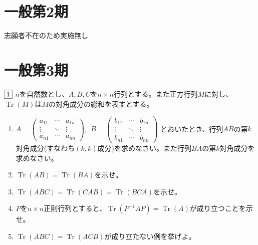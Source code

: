 \documentclass[dvipdfmx]{jsreport}
\DeclareMathOperator{\Tr}{Tr}
\newcounter{num}[section]
\begin{document}
\begin{answer}
\begin{enumerate}
\end{enumerate}
\end{answer}

\section{一般第2期}
	志願者不在のため実施無し

\section{一般第3期}
\begin{tcolorbox} %
	$\fbox{1}$ $n$を自然数とし、$A, B, C$を$n\times n$行列とする。また正方行列$M$に対し、$\Tr{(M)}$は$M$の対角成分の総和を表すとする。
\begin{enumerate}
	\item $
	A= 
\begin{pmatrix}
	a_{11}& \cdots& a_{1n}\\
	\vdots& \ddots& \vdots\\
	a_{n1}& \cdots& a_{nn}
\end{pmatrix},\ \ 
	B= 
\begin{pmatrix}
	b_{11}& \cdots& b_{1n}\\
	\vdots& \ddots& \vdots\\
	b_{n1}& \cdots& b_{nn}
\end{pmatrix}$
	とおいたとき、行列$AB$の第$k$対角成分(すなわち$(k, k)$成分)を求めなさい。また行列$BA$の第$k$対角成分を求めなさい。
	\item $\Tr{(AB)}= \Tr{(BA)}$を示せ。
	\item $\Tr{(ABC)}= \Tr{(CAB)}= \Tr{(BCA)}$を示せ。
	\item $P$を$n\times n$正則行列とすると、$\Tr{(P^{-1}AP)}= \Tr{(A)}$が成り立つことを示せ。
	\item $\Tr{(ABC)}= \Tr{(ACB)}$が成り立たない例を挙げよ。
\end{enumerate}
\end{tcolorbox}
\end{document}
